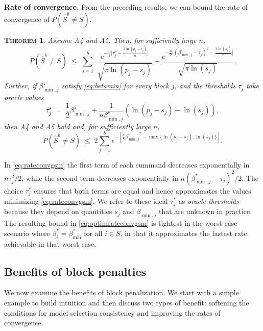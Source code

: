 \documentclass[aos]{imsart}
\theoremstyle{plain}
\newtheorem{thm}{\textsc{Theorem}}[section]
\begin{document}
\noindent\textbf{Rate of convergence.} From the
preceding results, we can bound the rate of convergence of $P(\hat S^{b}\neq S)$.
\begin{thm}\label{theo:fullrecovGS}
Assume A4 and A5. Then, for sufficiently large $n$,
\begin{equation} \label{eq:rateconvgsm}
P(\hat{S}^{b} \neq S)\;\leq\;\sum_{j=1}^b\,\,\frac{e^{-\tfrac{n}{2}\big[\tau_j^2-\tfrac{2\ln(p_j-s_j)}{n}\big]}}{\sqrt{\pi\ln(p_j-s_j)}}+\frac{e^{-\tfrac{n}{2}\big[(\beta^\star_{\min,j}-\tau_j)^2-\tfrac{2\ln(s_j)}{n}\big]}}{\sqrt{\pi\ln(s_j)}}.
\end{equation}
 Further, %
if $\beta^\star_{\min,j}$ satisfy \eqref{eq:betamin} for every block $j$, and the thresholds $\tau_j$ take oracle values
	\begin{equation} \label{eq:optimtauj}
\tau^\star_j \;=\; \frac{1}{2}\beta^\star_{\min,j}+\frac{1}{n\beta^\star_{\min,j}}(\ln({p_j-s_j})-\ln({s_j})),
\end{equation}
then A4 and A5 hold and, for sufficiently large $n$,
\begin{equation}\label{eq:optimrateconvgsm}
    P(\hat{S}^{b} \neq S) \; \leq \; 2 \sum_{j=1}^be^{-[\frac{n}{8}{\beta^\star_{\min,j}}^2-\max\{\ln(p_j-s_j),\ln(s_j)\}]}.
\end{equation}
\end{thm}
In \eqref{eq:rateconvgsm} the first term of each summand decreases exponentially in $n\tau_j^2/2$, while the second term decreases exponentially in $n(\beta_{\min,j}^*-\tau_j)^2/2$. The choice $\tau^*_j$ ensures that both terms are equal and hence approximates the values minimizing \eqref{eq:rateconvgsm}. We refer to these ideal $\tau^*_j$ as {\it oracle thresholds} because they depend on quantities $s_j$ and $\beta_{\min,j}$ that are unknown in practice. 
The resulting bound in \eqref{eq:optimrateconvgsm} is tightest in the worst-case scenario where $\beta_i^*=\beta_{\min}^*$ for all $i \in S$, in that it approximates the fastest rate achievable in that worst case.

\subsection{Benefits of block penalties}\label{sec:prosconsblock}


We now examine the benefits of block penalization. We start with a simple example to build intuition and then discuss
two types of benefit: softening the %
conditions for model selection consistency and 
improving the %
rates of convergence.
\end{document}
